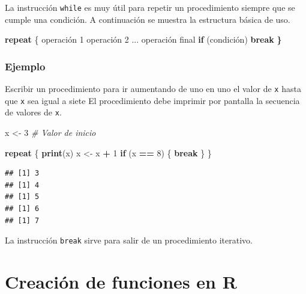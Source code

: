 \documentclass[10pt,]{krantz}
\makeatletter
\newenvironment{Shaded}{\begin{snugshade}}{\end{snugshade}}
\newcommand{\KeywordTok}[1]{\textcolor[rgb]{0.13,0.29,0.53}{\textbf{#1}}}
\newcommand{\DecValTok}[1]{\textcolor[rgb]{0.00,0.00,0.81}{#1}}
\newcommand{\StringTok}[1]{\textcolor[rgb]{0.31,0.60,0.02}{#1}}
\newcommand{\CommentTok}[1]{\textcolor[rgb]{0.56,0.35,0.01}{\textit{#1}}}
\newcommand{\ControlFlowTok}[1]{\textcolor[rgb]{0.13,0.29,0.53}{\textbf{#1}}}
\newcommand{\OperatorTok}[1]{\textcolor[rgb]{0.81,0.36,0.00}{\textbf{#1}}}
\newcommand{\ErrorTok}[1]{\textcolor[rgb]{0.64,0.00,0.00}{\textbf{#1}}}
\newcommand{\NormalTok}[1]{#1}
\let\proglang=\textsf
\newenvironment{kframe}{%
\medskip{}
\setlength{\fboxsep}{.8em}
 \def\at@end@of@kframe{}%
 \ifinner\ifhmode%
  \def\at@end@of@kframe{\end{minipage}}%
  \begin{minipage}{\columnwidth}%
 \fi\fi%
 \def\FrameCommand##1{\hskip\@totalleftmargin \hskip-\fboxsep
 \colorbox{shadecolor}{##1}\hskip-\fboxsep
     \hskip-\linewidth \hskip-\@totalleftmargin \hskip\columnwidth}%
 \MakeFramed {\advance\hsize-\width
   \@totalleftmargin\z@ \linewidth\hsize
   \@setminipage}}%
 {\par\unskip\endMakeFramed%
 \at@end@of@kframe}
\renewenvironment{Shaded}{\begin{kframe}}{\end{kframe}}
\let\BeginKnitrBlock\begin \let\EndKnitrBlock\end
\makeatother
\begin{document}
La instrucción \texttt{while} es muy útil para repetir un procedimiento
siempre que se cumple una condición. A continuación se muestra la
estructura básica de uso.

\begin{Shaded}
\begin{Highlighting}[]
\ControlFlowTok{repeat}\NormalTok{ \{}
\NormalTok{  operación }\DecValTok{1}
\NormalTok{  operación }\DecValTok{2}
\NormalTok{  ...}
\NormalTok{  operación final}
  \ControlFlowTok{if}\NormalTok{ (condición) }\ControlFlowTok{break}
\ErrorTok{\}}
\end{Highlighting}
\end{Shaded}

\subsection*{Ejemplo}\label{ejemplo-19}


Escribir un procedimiento para ir aumentando de uno en uno el valor de
\texttt{x} hasta que \texttt{x} sea igual a siete El procedimiento debe
imprimir por pantalla la secuencia de valores de \texttt{x}.

\begin{Shaded}
\begin{Highlighting}[]
\NormalTok{x <-}\StringTok{ }\DecValTok{3}  \CommentTok{# Valor de inicio}

\ControlFlowTok{repeat}\NormalTok{ \{}
   \KeywordTok{print}\NormalTok{(x)}
\NormalTok{   x <-}\StringTok{  }\NormalTok{x }\OperatorTok{+}\StringTok{ }\DecValTok{1}
   \ControlFlowTok{if}\NormalTok{ (x }\OperatorTok{==}\StringTok{ }\DecValTok{8}\NormalTok{) \{}
     \ControlFlowTok{break}
\NormalTok{   \}}
\NormalTok{\}}
\end{Highlighting}
\end{Shaded}

\begin{verbatim}
## [1] 3
## [1] 4
## [1] 5
## [1] 6
## [1] 7
\end{verbatim}

\BeginKnitrBlock{rmdtip}
La instrucción \texttt{break} sirve para salir de un procedimiento
iterativo.
\EndKnitrBlock{rmdtip}

\chapter{\texorpdfstring{Creación de funciones en \proglang{R}
\label{creafun}}{Creación de funciones en  }}\label{creacion-de-funciones-en}
\end{document}
